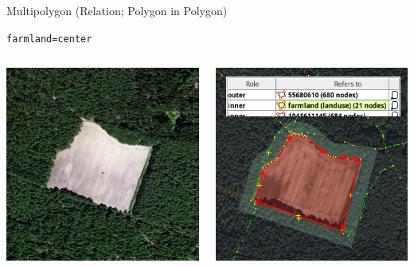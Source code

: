\documentclass{beamer}
\begin{document}
			\begin{frame}{Multipolygon (Relation; Polygon in Polygon)}
				\begin{center}
					\texttt{farmland=center}
					\vspace{0.5cm}
					\begin{columns}
						\begin{column}{4cm}
							\includegraphics[width=\linewidth]{images/multipolygon-example.png}
						\end{column}
						\begin{column}{4cm}
							\includegraphics[width=\linewidth]{images/multipolygon-josm.png}

\end{column}
\end{columns}
\end{center}
\end{frame}
\end{document}
